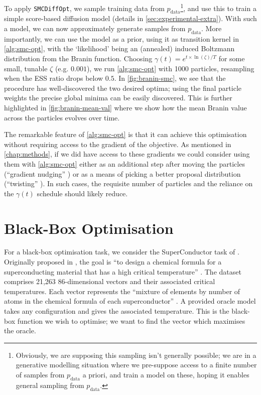 To apply \texttt{SMCDiffOpt}, we sample training data from $p_{\text{data}}$\footnote{Obviously, we
are supposing this sampling isn't generally possible; we are in a generative modelling situation
where we pre-suppose access to a finite number of samples from $p_{\text{data}}$ a priori, and
train a model on these, hoping it enables general sampling from $p_{\text{data}}$.}, and use this
to train a simple score-based diffusion model (details in \autoref{sec:experimental-extra}). With such
a model, we can now approximately generate samples from $p_{\text{data}}$. More importantly, we can
use the model as a prior, using it as transition kernel in \autoref{alg:smc-opt}, with the `likelihood'
being an (annealed) induced Boltzmann distribution from the Branin function. Choosing
$\gamma(t) = e^{t \times \ln(\zeta)/T}$ for some small, tunable $\zeta$ (e.g. $0.001$), we run
\autoref{alg:smc-opt} with 1000 particles, resampling when the ESS ratio drops below $0.5$. In
\autoref{fig:branin-smc}, we see that the procedure has well-discovered the two desired optima;
using the final particle weights the precise global minima can be easily discovered. This is further
highlighted in \autoref{fig:branin-mean-val} where we show how the mean Branin value across the
particles evolves over time.

The remarkable feature of \autoref{alg:smc-opt} is that it can achieve this optimisation without
requiring access to the gradient of the objective. As mentioned in \autoref{chap:methods}, if we did
have access to these gradients we could consider using them with \autoref{alg:smc-opt} either as an
additional step after moving the particles
(``gradient nudging'' \parencite{akyildizNudgingParticleFilter2020}) or as a means of picking a
better proposal distribution (``twisting'' \parencite{wuPracticalAsymptoticallyExact2023}). In
such cases, the requisite number of particles and the reliance on the $\gamma(t)$ schedule should
likely reduce.

\section{Black-Box Optimisation} \label{sec:superconductor}

For a black-box optimisation task, we consider the SuperConductor task of
\textcite{trabuccoDesignBenchBenchmarksDataDriven2022}. Originally proposed in
\textcite{HAMIDIEH2018346}, the goal is ``to design a chemical formula for a superconducting
material that has a high critical temperature'' \parencite{trabuccoDesignBenchBenchmarksDataDriven2022}.
The dataset comprises 21,263 86-dimensional vectors and their associated critical temperatures. Each
vector represents the ``mixture of elements by number of atoms in the chemical
formula of each superconductor'' \parencite{trabuccoDesignBenchBenchmarksDataDriven2022}. A provided
oracle model takes any configuration and gives the associated temperature. This is the black-box
function we wish to optimise; we want to find the vector which maximises the oracle.

